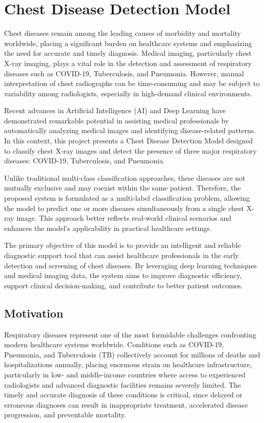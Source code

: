 \section{Chest Disease Detection Model}
Chest diseases remain among the leading causes of morbidity and mortality worldwide, placing a significant burden on healthcare systems and emphasizing the need for accurate and timely diagnosis. Medical imaging, particularly chest X-ray imaging, plays a vital role in the detection and assessment of respiratory diseases such as COVID-19, Tuberculosis, and Pneumonia. However, manual interpretation of chest radiographs can be time-consuming and may be subject to variability among radiologists, especially in high-demand clinical environments.

Recent advances in Artificial Intelligence (AI) and Deep Learning have demonstrated remarkable potential in assisting medical professionals by automatically analyzing medical images and identifying disease-related patterns. In this context, this project presents a Chest Disease Detection Model designed to classify chest X-ray images and detect the presence of three major respiratory diseases: COVID-19, Tuberculosis, and Pneumonia.

Unlike traditional multi-class classification approaches, these diseases are not mutually exclusive and may coexist within the same patient. Therefore, the proposed system is formulated as a multi-label classification problem, allowing the model to predict one or more diseases simultaneously from a single chest X-ray image. This approach better reflects real-world clinical scenarios and enhances the model's applicability in practical healthcare settings.

The primary objective of this model is to provide an intelligent and reliable diagnostic support tool that can assist healthcare professionals in the early detection and screening of chest diseases. By leveraging deep learning techniques and medical imaging data, the system aims to improve diagnostic efficiency, support clinical decision-making, and contribute to better patient outcomes.

\subsection{Motivation}
Respiratory diseases represent one of the most formidable challenges confronting modern healthcare systems worldwide. Conditions such as COVID-19, Pneumonia, and Tuberculosis (TB) collectively account for millions of deaths and hospitalizations annually, placing enormous strain on healthcare infrastructure, particularly in low- and middle-income countries where access to experienced radiologists and advanced diagnostic facilities remains severely limited. The timely and accurate diagnosis of these conditions is critical, since delayed or erroneous diagnoses can result in inappropriate treatment, accelerated disease progression, and preventable mortality.

